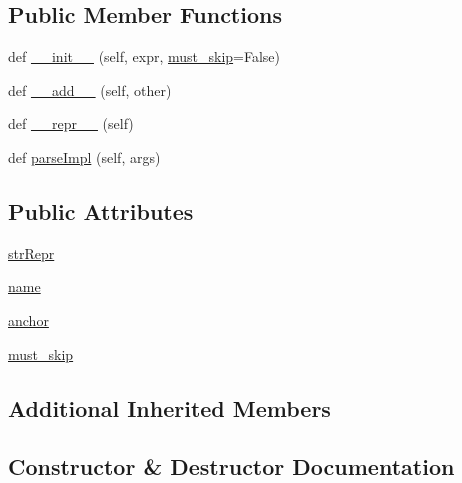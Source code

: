 \subsection*{Public Member Functions}
\begin{DoxyCompactItemize}
\item 
def \hyperlink{classpip_1_1__vendor_1_1pyparsing_1_1__PendingSkip_a8e2f4bf3c50fe02ad8cd906c37aae197}{\+\_\+\+\_\+init\+\_\+\+\_\+} (self, expr, \hyperlink{classpip_1_1__vendor_1_1pyparsing_1_1__PendingSkip_a671bdce51c238172c9c3e8cd3c7027b1}{must\+\_\+skip}=False)
\item 
def \hyperlink{classpip_1_1__vendor_1_1pyparsing_1_1__PendingSkip_add4fa4df847c2ff61988c1a49876ab1d}{\+\_\+\+\_\+add\+\_\+\+\_\+} (self, other)
\item 
def \hyperlink{classpip_1_1__vendor_1_1pyparsing_1_1__PendingSkip_a89db89d7c85a369639b9c6ea4387ac6d}{\+\_\+\+\_\+repr\+\_\+\+\_\+} (self)
\item 
def \hyperlink{classpip_1_1__vendor_1_1pyparsing_1_1__PendingSkip_a0131e6b87ea55fc84ec44f852b9ed982}{parse\+Impl} (self, args)
\end{DoxyCompactItemize}
\subsection*{Public Attributes}
\begin{DoxyCompactItemize}
\item 
\hyperlink{classpip_1_1__vendor_1_1pyparsing_1_1__PendingSkip_abd1d3b76aeffeeec22adc2f64b255d90}{str\+Repr}
\item 
\hyperlink{classpip_1_1__vendor_1_1pyparsing_1_1__PendingSkip_a361d6cfc183abd8e776eaf5b158a8a37}{name}
\item 
\hyperlink{classpip_1_1__vendor_1_1pyparsing_1_1__PendingSkip_a3ba2a157e63371f8c3e6c2a9c42f1088}{anchor}
\item 
\hyperlink{classpip_1_1__vendor_1_1pyparsing_1_1__PendingSkip_a671bdce51c238172c9c3e8cd3c7027b1}{must\+\_\+skip}
\end{DoxyCompactItemize}
\subsection*{Additional Inherited Members}


\subsection{Constructor \& Destructor Documentation}
\mbox{\label{classpip_1_1__vendor_1_1pyparsing_1_1__PendingSkip_a8e2f4bf3c50fe02ad8cd906c37aae197}} 
